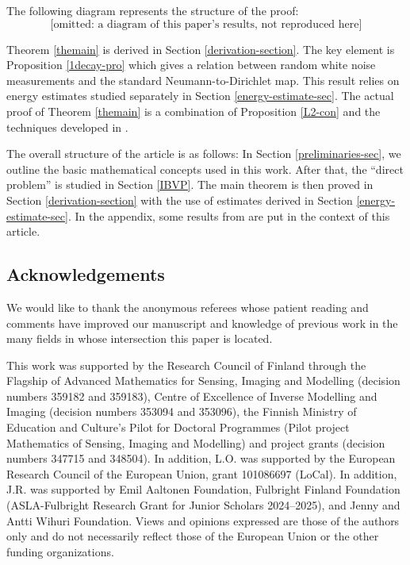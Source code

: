 \documentclass[10pt,a4paper]{article}
\theoremstyle{plain}
\theoremstyle{definition}
\theoremstyle{remark}
\newtheorem{remark}[theorem]{Remark}
\numberwithin{equation}{section}
\begin{document}
The following diagram represents the structure of the proof:
\begin{equation}\label{tree1}
\mbox{[omitted: a diagram of this paper's results, not reproduced here]}
\end{equation}

Theorem \ref{themain} is derived in Section \ref{derivation-section}. 
The key element is Proposition \ref{1decay-pro} which gives a relation between random white noise measurements and the standard Neumann-to-Dirichlet map.  
This result relies on energy estimates studied separately in Section \ref{energy-estimate-sec}. 
The actual proof of Theorem \ref{themain} is a combination of Proposition \ref{L2-con} and  the techniques  developed in  \cite{sondhi_gopinath}. 

The overall structure of the article is as follows: 
In Section \ref{preliminaries-sec}, we outline the basic mathematical concepts used in this work. After that, the ``direct problem'' is studied in Section \ref{IBVP}. The main theorem is then  proved in Section  \ref{derivation-section} with the use of estimates derived in Section \ref{energy-estimate-sec}. In the appendix,  some results from  \cite{sondhi_gopinath} are put in the context of this article.  




\subsection*{Acknowledgements}
{ We would like to thank the anonymous referees whose patient reading and comments have improved our manuscript and knowledge of previous work in the many fields in whose intersection this paper is located.}

This work was supported by the Research Council of Finland through the Flagship of Advanced Mathematics for Sensing, Imaging and Modelling (decision numbers 359182 and 359183), Centre of Excellence of Inverse Modelling and Imaging (decision numbers 353094 and 353096), the Finnish Ministry of Education and Culture’s Pilot for Doctoral Programmes (Pilot project Mathematics of Sensing, Imaging and Modelling) and project grants (decision numbers 347715 and 348504). In addition, L.O. was supported by the European Research Council of the European Union, grant 101086697 (LoCal). In addition, J.R. was supported by Emil Aaltonen Foundation, Fulbright Finland Foundation (ASLA-Fulbright Research Grant for Junior Scholars 2024--2025), and Jenny and Antti Wihuri Foundation. Views and opinions expressed are those of the authors only and do not necessarily reflect those of the European Union or the other funding organizations. 
\end{document}
